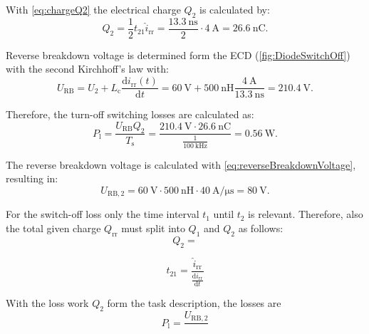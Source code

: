 \begin{solutionblock}
    With \eqref{eq:chargeQ2} the electrical charge $Q_2$ is calculated by:
    \begin{equation}
        Q_2 = \frac{1}{2} t_{21} \hat{i}_{\mathrm{rr}} = \frac{\SI{13.3}{\nano\second}}{2} \cdot \SI{4}{\ampere} = \SI{26.6}{\nano\coulomb}.
    \end{equation}

    Reverse breakdown voltage is determined form the ECD (\autoref{fig:DiodeSwitchOff}) with the second Kirchhoff's law with:
    \begin{equation}
        U_{\mathrm{RB}} = U_2 + L_{\mathrm{c}} \frac{\mathrm{d}i_{\mathrm{rr}}(t)}{\mathrm{d}t} = \SI{60}{\volt} + \SI{500}{\nano\henry} \frac{\SI{4}{\ampere}}{\SI{13.3}{\nano\second}} = \SI{210.4}{\volt}.
        \label{eq:reverseBreakdownVoltage}
    \end{equation}

    Therefore, the turn-off switching losses are calculated as:
    \begin{equation}
        P_{\mathrm{l}} = \frac{U_{\mathrm{RB}}Q_2}{T_{\mathrm{s}}} = \frac{\SI{210.4}{\volt}\cdot \SI{26.6}{\nano\coulomb}}{\frac{1}{\SI{100}{\kilo\hertz}}} = \SI{0.56}{\watt}.
    \end{equation}

\end{solutionblock}




\begin{solutionblock}
    The reverse breakdown voltage is calculated with \eqref{eq:reverseBreakdownVoltage}, resulting in:
    \begin{equation}
        U_{\mathrm{RB,2}} = \SI{60}{\volt} \cdot \SI{500}{\nano\henry} \cdot \SI{40}{\ampere\per\micro\second} = \SI{80}{\volt}. 
    \end{equation}

    For the switch-off loss only the time interval $t_1$ until $t_2$ is relevant. Therefore, also the total given charge $Q_{\mathrm{rr}}$ must split into $Q_1$ and $Q_2$ as follows:
    \begin{equation}
        Q_2 = 
    \end{equation}

    \begin{equation}
        t_{21} = \frac{\hat{i}_{\mathrm{rr}}}{\frac{\mathrm{d}i_{\mathrm{rr}}}{\mathrm{d}t}}
    \end{equation}


    With the loss work $Q_2$ form the task description, the losses are
    \begin{equation}
        P_{\mathrm{l}} = \frac{U_{\mathrm{RB,2}}}{}
    \end{equation}

\end{solutionblock}



